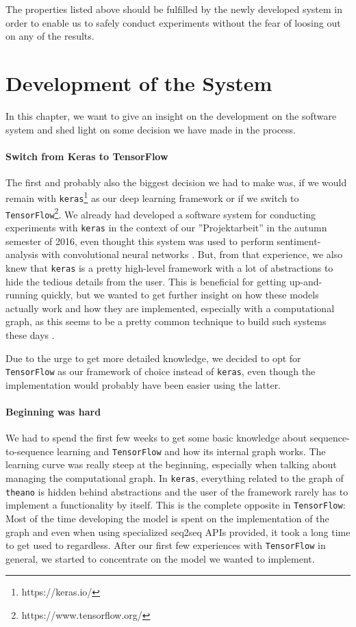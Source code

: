 The properties listed above should be fulfilled by the newly developed system in order to enable us to safely conduct experiments without the fear of loosing out on any of the results.

\section{Development of the System}
\label{sofware_system:development_history}
In this chapter, we want to give an insight on the development on the software system and shed light on some decision we have made in the process.

\paragraph{Switch from Keras to TensorFlow} The first and probably also the biggest decision we had to make was, if we would remain with \texttt{keras}\footnote{https://keras.io/} as our deep learning framework or if we switch to \texttt{TensorFlow}\footnote{https://www.tensorflow.org/}. We already had developed a software system for conducting experiments with \texttt{keras} in the context of our ''Projektarbeit'' in the autumn semester of 2016, even thought this system was used to perform sentiment-analysis with convolutional neural networks \cite{Vongruenigen:2017}. But, from that experience, we also knew that \texttt{keras} is a pretty high-level framework with a lot of abstractions to hide the tedious details from the user. This is beneficial for getting up-and-running quickly, but we wanted to get further insight on how these models actually work and how they are implemented, especially with a computational graph, as this seems to be a pretty common technique to build such systems these days \cite{TensorFlow:2015}\cite{Theano:2016}\cite{Torch:2011}.

Due to the urge to get more detailed knowledge, we decided to opt for \texttt{TensorFlow} as our framework of choice instead of \texttt{keras}, even though the implementation would probably have been easier using the latter.
\paragraph{Beginning was hard} We had to spend the first few weeks to get some basic knowledge about sequence-to-sequence learning and \texttt{TensorFlow} and how its internal graph works. The learning curve was really steep at the beginning, especially when talking about managing the computational graph. In \texttt{keras}, everything related to the graph of \texttt{theano} is hidden behind abstractions and the user of the framework rarely has to implement a functionality by itself. This is the complete opposite in \texttt{TensorFlow}: Most of the time developing the model is spent on the implementation of the graph and even when using specialized seq2seq APIs provided, it took a long time to get used to regardless. After our first few experiences with \texttt{TensorFlow} in general, we started to concentrate on the model we wanted to implement.

